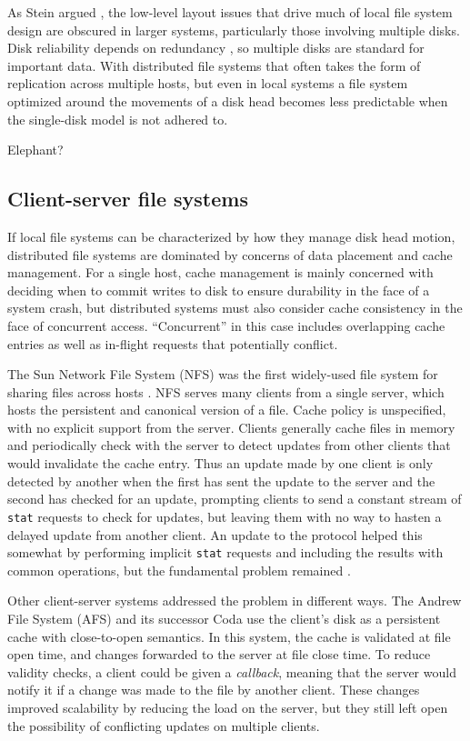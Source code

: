 As Stein argued \cite{stein05}, the low-level layout issues that drive much of local file system design are obscured in larger systems, particularly those involving multiple disks. Disk reliability depends on redundancy \cite{patterson}, so multiple disks are standard for important data. With distributed file systems that often takes the form of replication across multiple hosts, but even in local systems a file system optimized around the movements of a disk head becomes less predictable when the single-disk model is not adhered to.


Elephant? \cite{santry}

\subsection{Client-server file systems}

If local file systems can be characterized by how they manage disk head motion, distributed file systems are dominated by concerns of data placement and cache management. For a single host, cache management is mainly concerned with deciding when to commit writes to disk to ensure durability in the face of a system crash, but distributed systems must also consider cache consistency in the face of concurrent access. ``Concurrent'' in this case includes overlapping cache entries as well as in-flight requests that potentially conflict.

The Sun Network File System (NFS) was the first widely-used file system for sharing files across hosts \cite{sandberg}. NFS serves many clients from a single server, which hosts the persistent and canonical version of a file. Cache policy is unspecified, with no explicit support from the server. Clients generally cache files in memory and periodically check with the server to detect updates from other clients that would invalidate the cache entry. Thus an update made by one client is only detected by another when the first has sent the update to the server and the second has checked for an update, prompting clients to send a constant stream of \texttt{stat} requests to check for updates, but leaving them with no way to hasten a delayed update from another client. An update to the protocol helped this somewhat by performing implicit \texttt{stat} requests and including the results with common operations, but the fundamental problem remained \cite{pawlowski,callaghan}.

Other client-server systems addressed the problem in different ways. The Andrew File System (AFS) \cite{satyanarayanan85,howard} and its successor Coda \cite{satyanarayanan90} use the client's disk as a persistent cache with close-to-open semantics. In this system, the cache is validated at file open time, and changes forwarded to the server at file close time. To reduce validity checks, a client could be given a \emph{callback}, meaning that the server would notify it if a change was made to the file by another client. These changes improved scalability by reducing the load on the server, but they still left open the possibility of conflicting updates on multiple clients.

